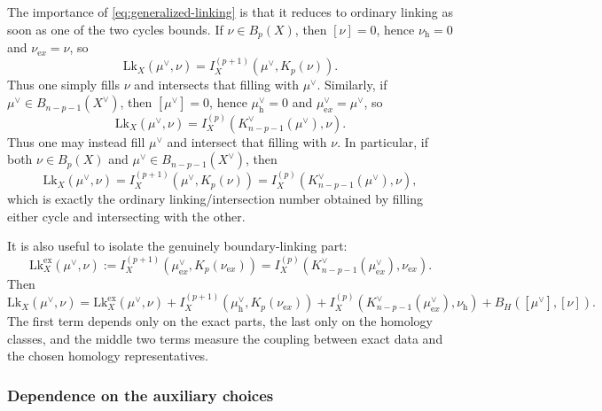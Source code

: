 \documentclass[dvipsnames,a4paper]{article}
\numberwithin{equation}{section}
\theoremstyle{definition}
\theoremstyle{remark}
\newcommand{\Lk}{\mathrm{Lk}}
\begin{document}
The importance of \eqref{eq:generalized-linking} is that it reduces to ordinary linking
as soon as one of the two cycles bounds. If \(\nu\in B_p(X)\), then \([\nu]=0\), hence \(\nu_{\mathrm h}=0\) and
\(\nu_{\mathrm ex}=\nu\), so
\begin{equation}
	\Lk_X(\mu^\vee,\nu)
	=
	I_X^{(p+1)}\left(\mu^\vee,K_p(\nu)\right).
	\label{eq:primal-exact}
\end{equation}
Thus one simply fills \(\nu\) and intersects that filling with \(\mu^\vee\). Similarly, if \(\mu^\vee\in B_{n-p-1}(X^\vee)\), then \([\mu^\vee]=0\), hence
\(\mu^\vee_{\mathrm h}=0\) and \(\mu^\vee_{\mathrm ex}=\mu^\vee\), so
\begin{equation}
	\Lk_X(\mu^\vee,\nu)
	=
	I_X^{(p)}\left(K^\vee_{n-p-1}(\mu^\vee),\nu\right).
	\label{eq:dual-exact}
\end{equation}
Thus one may instead fill \(\mu^\vee\) and intersect that filling with \(\nu\). In particular, if both \(\nu\in B_p(X)\) and \(\mu^\vee\in B_{n-p-1}(X^\vee)\), then
\begin{equation}
	\Lk_X(\mu^\vee,\nu)
	=
	I_X^{(p+1)}\left(\mu^\vee,K_p(\nu)\right)
	=
	I_X^{(p)}\left(K^\vee_{n-p-1}(\mu^\vee),\nu\right),
	\label{eq:boundary-linking}
\end{equation}
which is exactly the ordinary linking/intersection number obtained by filling either cycle
and intersecting with the other.

It is also useful to isolate the genuinely boundary-linking part:
\begin{equation}
	\Lk_X^{\mathrm{ex}}(\mu^\vee,\nu)
	:=
	I_X^{(p+1)}\left(\mu^\vee_{\mathrm ex},K_p(\nu_{\mathrm ex})\right)
	=
	I_X^{(p)}\left(K^\vee_{n-p-1}(\mu^\vee_{\mathrm ex}),\nu_{\mathrm ex}\right).
	\label{eq:exact-linking}
\end{equation}
Then
\begin{equation}
	\Lk_X(\mu^\vee,\nu)
	=
	\Lk_X^{\mathrm{ex}}(\mu^\vee,\nu)
	+
	I_X^{(p+1)}\left(\mu^\vee_{\mathrm h},K_p(\nu_{\mathrm ex})\right)
	+
	I_X^{(p)}\left(K^\vee_{n-p-1}(\mu^\vee_{\mathrm ex}),\nu_{\mathrm h}\right)
	+
	B_H\left([\mu^\vee],[\nu]\right).
	\label{eq:linking-decomposition}
\end{equation}
The first term depends only on the exact parts, the last only on the homology classes, and
the middle two terms measure the coupling between exact data and the chosen homology
representatives.

\subsubsection{Dependence on the auxiliary choices}
\end{document}
